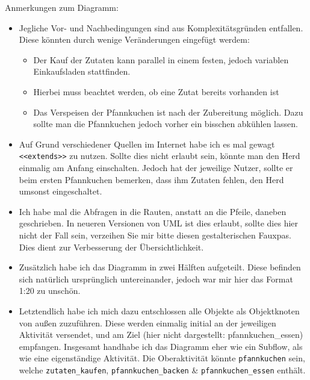 \documentclass{article}
\newcommand{\gqq}[1]{\glqq{}#1\grqq{}}
\begin{document}
    \newpage
    Anmerkungen zum Diagramm:
    \begin{itemize}
        \item Jegliche Vor- und Nachbedingungen sind aus Komplexitätsgründen entfallen.
            Diese könnten durch wenige Veränderungen eingefügt werdem:
            \begin{itemize}
                \item Der Kauf der Zutaten kann parallel in einem festen, jedoch variablen Einkaufsladen stattfinden.
                \item Hierbei muss beachtet werden, ob eine Zutat bereits vorhanden ist
                \item Das Verspeisen der Pfannkuchen ist nach der Zubereitung möglich.
                    Dazu sollte man die Pfannkuchen jedoch vorher ein bisschen abkühlen lassen.
            \end{itemize} 
        \item Auf Grund verschiedener Quellen im Internet habe ich es mal gewagt \texttt{<<extends>>} zu nutzen.
            Sollte dies nicht erlaubt sein, könnte man den Herd einmalig am Anfang einschalten.
            Jedoch hat der jeweilige Nutzer, sollte er beim ersten Pfannkuchen bemerken, dass ihm Zutaten fehlen, den Herd umsonst eingeschaltet.
        \item Ich habe mal die Abfragen in die Rauten, anstatt an die Pfeile, daneben geschrieben.
            In neueren Versionen von UML ist dies erlaubt, sollte dies hier nicht der Fall sein, verzeihen Sie mir bitte diesen gestalterischen Fauxpas.
            Dies dient zur Verbesserung der Übersichtlichkeit.
        \item Zusätzlich habe ich das Diagramm in zwei Hälften aufgeteilt.
            Diese befinden sich natürlich ursprünglich untereinander, jedoch war mir hier das Format 1:20 zu unschön.
        \item Letztendlich habe ich mich dazu entschlossen alle Objekte als Objektknoten von außen zuzuführen.
            Diese werden einmalig initial an der jeweiligen Aktivität versendet, und am Ziel (hier nicht dargestellt: \gqq{pfannkuchen\_essen}) empfangen.
            Insgesamt handhabe ich das Diagramm eher wie ein Subflow, als wie eine eigenständige Aktivität.
            Die \gqq{Oberaktivität} könnte \texttt{pfannkuchen} sein, welche \texttt{zutaten\_kaufen}, \texttt{pfannkuchen\_backen} \& \texttt{pfannkuchen\_essen} enthält.
    \end{itemize}
\end{document}
